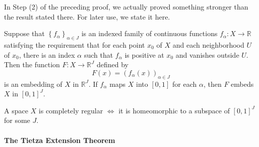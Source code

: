 In Step (2) of the preceding proof, we actually proved something stronger than the result stated there.
For later use, we state it here.

\begin{theorem}
  Suppose that \( \left\lbrace f_\alpha \right\rbrace_{\alpha \in J} \) is an indexed family of continuous functions \( f_\alpha: X \to \mathbb{R} \) satisfying the requirement that for each point \( x_0 \) of \( X \) and each neighborhood \( U \) of \( x_0 \), there is an index \( \alpha \) such that \( f_\alpha \) is positive at \( x_0 \) and vanishes outside \( U \).
  Then the function \( F: X \to \mathbb{R}^J \) defined by
  \[
    F(x) = (f_\alpha(x))_{\alpha \in J}
  \]
  is an embedding of \( X \) in \( \mathbb{R}^J \).
  If \( f_\alpha \) maps \( X \) into \( [0, 1] \) for each \( \alpha \), then \( F \) embeds \( X \) in \( [0, 1]^J \).
\end{theorem}

\begin{theorem}
  A space \( X \) is completely regular \( \iff \) it is homeomorphic to a subspace of \( [0, 1]^J \) for some \( J \).
\end{theorem}

\paragraph{The Tietza Extension Theorem}

